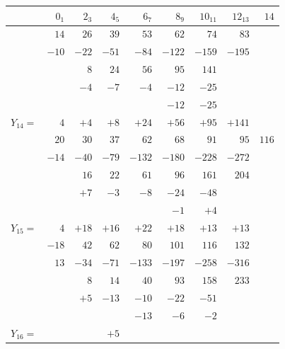 \documentclass[11pt]{article}
\begin{document}
\begin{center}\small
\begin{tabular}{l|rrrrrrrr}
          & $0_{1}$ & $2_{3}$ & $4_{5}$ & $6_{7}$ & $8_{9}$ & $10_{11}$ & $12_{13}$ & $14$ \\\hline
          & $14$    & $26$    & $39$    & $53$    & $62$    & $74$      & $83$      &      \\
          & $-10$   & $-22$   & $-51$   & $-84$   & $-122$  & $-159$    & $-195$    &      \\
          &         & $8$     & $24$    & $56$    & $95$    & $141$     &           &      \\
          &         & $-4$    & $-7$    & $-4$    & $-12$   & $-25$     &           &      \\
          &         &         &         &         & $-12$   & $-25$     &           &      \\
$Y_{14}=$ & $4$     & $+4$    & $+8$    & $+24$   & $+56$   & $+95$     & $+141$    &      \\\hline
          & $20$    & $30$    & $37$    & $62$    & $68$    & $91$      & $95$      & $116$\\
          & $-14$   & $-40$   & $-79$   & $-132$  & $-180$  & $-228$    & $-272$    &      \\
          &         & $16$    & $22$    & $61$    & $96$    & $161$     & $204$     &      \\
          &         & $+7$    & $-3$    & $-8$    & $-24$   & $-48$     &           &      \\
          &         &         &         &         & $-1$    & $+4$      &           &      \\
$Y_{15}=$ & $4$     & $+18$   & $+16$   & $+22$   & $+18$   & $+13$     & $+13$     &      \\\hline
          & $-18$   & $42$    & $62$    & $80$    & $101$   & $116$     & $132$     &      \\
          & $13$    & $-34$   & $-71$   & $-133$  & $-197$  & $-258$    & $-316$    &      \\
          &         & $8$     & $14$    & $40$    & $93$    & $158$     & $233$     &      \\
          &         & $+5$    & $-13$   & $-10$   & $-22$   & $-51$     &           &      \\
          &         &         &         & $-13$   & $-6$    & $-2$      &           &      \\
$Y_{16}=$ &         &         & $+5$    &         &         &           &           &      \\\hline

\end{tabular}
\end{center}
\end{document}
